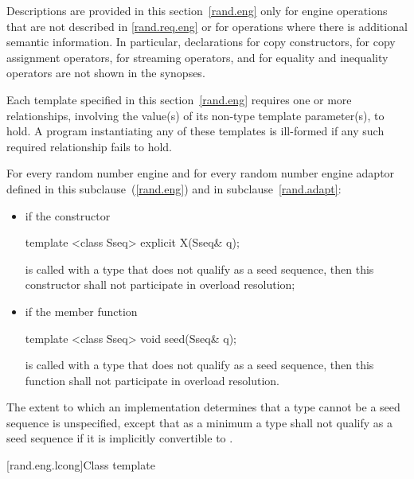 \pnum
Descriptions are provided in this section~\ref{rand.eng}
only for engine operations
that are not described in \ref{rand.req.eng}
or for operations where there is additional semantic information.
In particular,
declarations for copy constructors,
for copy assignment operators,
for streaming operators,
and for equality and inequality operators
are not shown in the synopses.

\pnum
Each template specified in this section~\ref{rand.eng}
requires one or more relationships,
involving the value(s) of its non-type template parameter(s), to hold.
A program instantiating any of these templates
is ill-formed
if any such required relationship fails to hold.

\pnum
For every random number engine and for every random number engine adaptor 
defined in this subclause~(\ref{rand.eng}) and in subclause~\ref{rand.adapt}:

\begin{itemize}
\item
if the constructor
\begin{codeblock}
template <class Sseq> explicit X(Sseq& q);
\end{codeblock}
is called with a type  that does not qualify as a seed sequence, then this
constructor shall not participate in overload resolution;

\item
if the member function
\begin{codeblock}
template <class Sseq> void seed(Sseq& q);
\end{codeblock}
is called with a type  that does not qualify as a seed sequence, then this
function shall not participate in overload resolution.
\end{itemize}

The extent to which an implementation determines that a type cannot be a seed sequence
is unspecified, except that as a minimum a type shall not qualify as a seed sequence
if it is implicitly convertible to .


[rand.eng.lcong]{Class template }%
%

